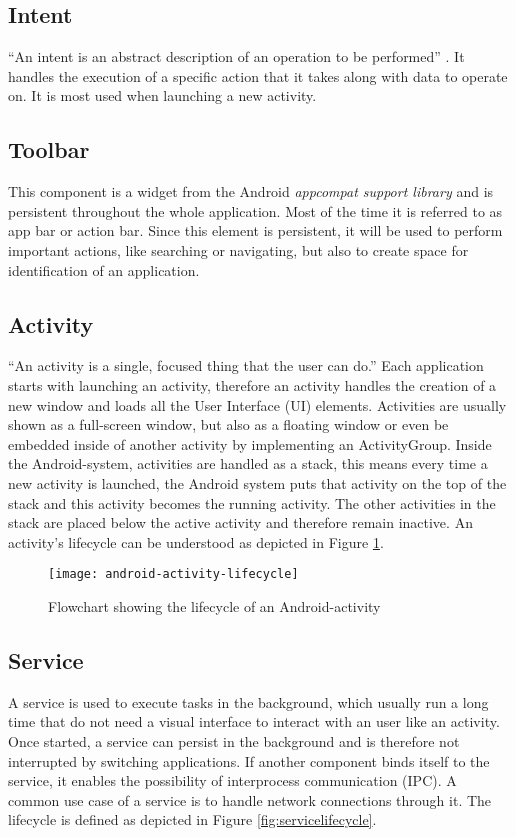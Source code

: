 \subsection{Intent}
``An intent is an abstract description of an operation to be performed'' \autocite{AndroidIntent}. It handles the execution of a specific action that it takes along with data to operate on. It is most used when launching a new activity.

\subsection{Toolbar}
This component is a widget from the Android \emph{appcompat support library} and is persistent throughout the whole application. Most of the time it is referred to as app bar or action bar. Since this element is persistent, it will be used to perform important actions, like searching or navigating, but also to create space for identification of an application.

\subsection{Activity}
``An activity is a single, focused thing that the user can do.'' \autocite{AndroidActivity} Each application starts with launching an activity, therefore an activity handles the creation of a new window and loads all the User Interface (UI) elements. Activities are usually shown as a full-screen window, but also as a floating window or even be embedded inside of another activity by implementing an ActivityGroup. Inside the Android-system, activities are handled as a stack, this means every time a new activity is launched, the Android system puts that activity on the top of the stack and this activity becomes the running activity. The other activities in the stack are placed below the active activity and therefore remain inactive. An activity's lifecycle can be understood as depicted in Figure \ref{fig:activitylifecycle}.

\begin{figure}[H]
    \centering
    \texttt{[image: android-activity-lifecycle]}
    \caption{Flowchart showing the lifecycle of an Android-activity}
    \label{fig:activitylifecycle}
\end{figure}

\subsection{Service}
A service is used to execute tasks in the background, which usually run a long time that do not need a visual interface to interact with an user like an activity. Once started, a service can persist in the background and is therefore not interrupted by switching applications. If another component binds itself to the service, it enables the possibility of interprocess communication (IPC). A common use case of a service is to handle network connections through it. The lifecycle is defined as depicted in Figure \ref{fig:servicelifecycle}.

